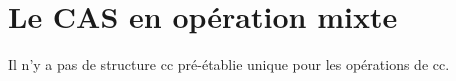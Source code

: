 \section{Le CAS en opération mixte}

\begin{e1}
	\item Il n'y a pas de structure \gls{cc} pré-établie unique pour les opérations de \gls{cc}.
\end{e1}